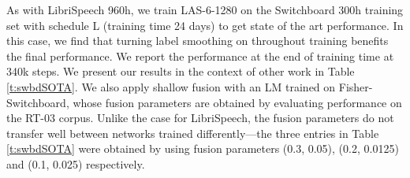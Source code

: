 \documentclass[a4paper]{article}
\begin{document}
As with LibriSpeech 960h, we train LAS-6-1280 on the Switchboard 300h training set with schedule L (training time  24 days) to get state of the art performance. In this case, we find that turning label smoothing on throughout training benefits the final performance. We report the performance at the end of training time at 340k steps. We present our results in the context of other work in Table \ref{t:swbdSOTA}.  We also apply shallow fusion with an LM trained on Fisher-Switchboard, whose fusion parameters are obtained by evaluating performance on the RT-03 corpus. Unlike the case for LibriSpeech, the fusion parameters do not transfer well between networks trained differently---the three entries in Table \ref{t:swbdSOTA} were obtained by using fusion parameters  (0.3, 0.05), (0.2, 0.0125) and (0.1, 0.025) respectively.
\end{document}
